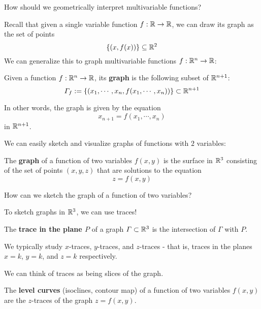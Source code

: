 \begin{motivating}
How should we geometrically interpret multivariable functions?
\end{motivating}

Recall that given a single variable function $f: \mathbb{R} \to \mathbb{R}$, we can draw its graph as the set of points $$\{(x, f(x)) \} \subseteq \mathbb{R}^2$$  We can generalize this to graph multivariable functions $f : \mathbb{R}^n \to \mathbb{R}$:

\begin{definition}
Given a function $f: \mathbb{R}^n \to \mathbb{R}$, its \textbf{graph} is the following subset of $\mathbb{R}^{n+1}$:
$$\Gamma_f := \{(x_1,\cdots, x_n,f(x_1, \cdots, x_n)) \} \subset \mathbb{R}^{n+1}$$ 

In other words, the graph is given by the equation $$x_{n+1} = f(x_1, \cdots, x_n)$$ in $\mathbb{R}^{n+1}$.
\end{definition}

We can easily sketch and visualize graphs of functions with $2$ variables:

\begin{definition}
    The \textbf{graph} of a function of two variables $f(x,y)$ is the surface in $\mathbb{R}^3$ consisting of the set of points $(x,y,z)$ that are solutions to the equation
    $$z = f(x,y)$$
\end{definition}

\begin{motivating}
How can we sketch the graph of a function of two variables?
\end{motivating}

To sketch graphs in $\mathbb{R}^3$, we can use traces!

\begin{definition}
    The \textbf{trace in the plane $P$} of a graph $\Gamma \subset \mathbb{R}^3$ is the intersection of $\Gamma$ with $P$.  
    
    We typically study $x$-traces, $y$-traces, and $z$-traces - that is, traces in the planes $x=k$, $y=k$, and $z=k$ respectively.
    
\end{definition}

We can think of traces as being slices of the graph. 

\begin{definition}
    The \textbf{level curves} (isoclines, contour map) of a function of two variables $f(x,y)$ are the $z$-traces of the graph $z = f(x,y)$.
\end{definition}


